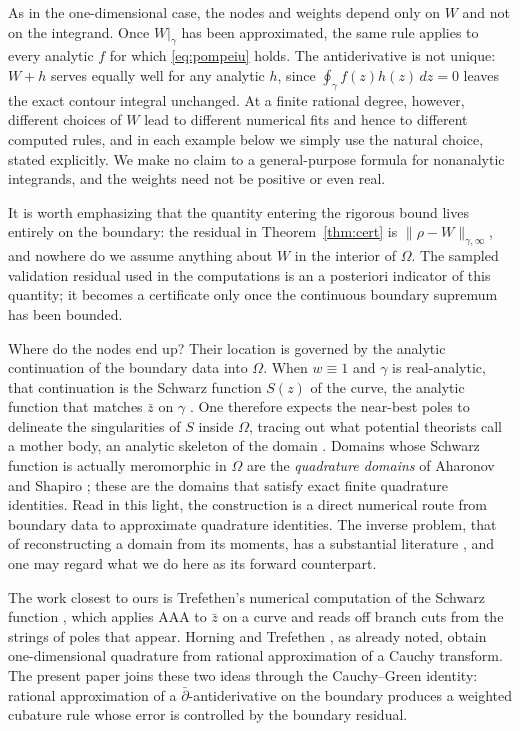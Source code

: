 \documentclass[onefignum,onetabnum]{siamart220329}
\begin{document}
As in the one-dimensional case, the nodes and weights depend only on
$W$ and not on the integrand. Once $W|_\gamma$ has been approximated,
the same rule applies to every analytic $f$ for which
\eqref{eq:pompeiu} holds. The antiderivative is not unique: $W+h$
serves equally well for any analytic $h$, since
$\oint_\gamma f(z)h(z)\,dz=0$ leaves the exact contour integral
unchanged. At a finite rational degree, however, different choices of
$W$ lead to different numerical fits and hence to different computed
rules, and in each example below we simply use the natural choice,
stated explicitly. We make no claim to a general-purpose formula for
nonanalytic integrands, and the weights need not be positive or even
real.

It is worth emphasizing that the quantity entering the rigorous bound
lives entirely on the boundary: the residual in Theorem~\ref{thm:cert}
is $\|\rho-W\|_{\gamma,\infty}$, and nowhere do we assume anything about
$W$ in the interior of $\Omega$. The sampled validation residual used in
the computations is an a posteriori indicator of this quantity; it
becomes a certificate only once the continuous boundary supremum has
been bounded.

Where do the nodes end up? Their location is governed by the analytic
continuation of the boundary data into $\Omega$. When $w \equiv 1$ and
$\gamma$ is real-analytic, that continuation is the Schwarz function
$S(z)$ of the curve, the analytic function that matches $\bar z$ on
$\gamma$ \cite{Davis1974}. One therefore expects the near-best poles to
delineate the singularities of $S$ inside $\Omega$, tracing out what
potential theorists call a mother body, an analytic skeleton of the
domain \cite{Zidarov,Gustafsson1998,GustafssonPutinar}. Domains whose Schwarz function is
actually meromorphic in $\Omega$ are the \emph{quadrature domains} of
Aharonov and Shapiro
\cite{AharonovShapiro1976,Sakai1982,GustafssonShapiro2005}; these are
the domains that satisfy exact finite quadrature identities. Read in
this light, the construction is a direct numerical route from boundary
data to approximate quadrature identities. The inverse problem, that of
reconstructing a domain from its moments, has a substantial literature
\cite{GHMP2000,GPSS2009}, and one may regard what we do here as its
forward counterpart.

The work closest to ours is Trefethen's numerical computation of the
Schwarz function \cite{Trefethen2025Schwarz}, which applies AAA to
$\bar z$ on a curve and reads off branch cuts from the strings of poles
that appear. Horning and Trefethen \cite{HorningTrefethen2026}, as
already noted, obtain one-dimensional quadrature from rational
approximation of a Cauchy transform. The present paper joins these two
ideas through the Cauchy--Green identity: rational approximation of a
$\bar\partial$-antiderivative on the boundary produces a weighted
cubature rule whose error is controlled by the boundary residual.
\end{document}
